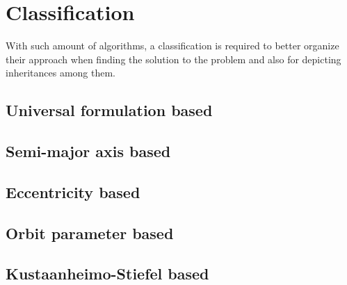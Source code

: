 \section{Classification}

With such amount of algorithms, a classification is required to better organize
their approach when finding the solution to the problem and also for depicting
inheritances among them.

\subsection{Universal formulation based}
\subsection{Semi-major axis based}
\subsection{Eccentricity based}
\subsection{Orbit parameter based}
\subsection{Kustaanheimo-Stiefel based}
